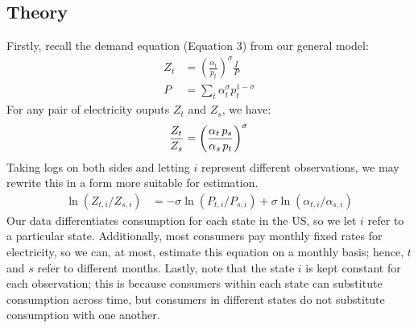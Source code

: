 \documentclass[11pt,a4paper]{extarticle}
\begin{document}
\subsection{Theory}


Firstly, recall the demand equation (Equation 3) from our general model:
\begin{align*}
Z_t &= \left(\frac{\alpha_t}{p_t} \right)^\sigma \frac{I}{P} \\
P &= \sum_t \alpha_t^\sigma p_t^{1-\sigma}
\end{align*}
For any pair of electricity ouputs $Z_t$ and $Z_s$, we have:
$$\frac{Z_t}{Z_s} = \left(\frac{\alpha_t \, p_s}{\alpha_s \, p_t} \right)^\sigma \\$$
Taking logs on both sides and letting $i$ represent different observations, we may rewrite this in a form more suitable for estimation. 
\begin{align*}
\ln (Z_{t, i} / Z_{ s, i}) &= -\sigma \ln (P_{t,i} / P_{s,i}) + \sigma \ln (\alpha_{t,i} / \alpha_{s,i}) 
\end{align*}
Our data differentiates consumption for each state in the US, so we let $i$ refer to a particular state. Additionally, most consumers pay monthly fixed rates for electricity, so we can, at most, estimate this equation on a monthly basis; hence, $t$ and $s$ refer to different months. Lastly, note that the state $i$ is kept constant for each observation; this is because consumers within each state can substitute consumption across time, but consumers in different states do not substitute consumption with one another. 
\end{document}
